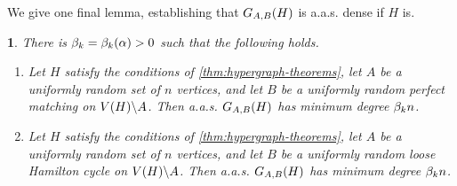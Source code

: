 \documentclass[11pt,english]{article}
\theoremstyle{plain}
\theoremstyle{definition}
\theoremstyle{definition}
\theoremstyle{plain}
\theoremstyle{plain}
\theoremstyle{plain}
\newtheorem{lem}[thm]{\protect\lemmaname}
\theoremstyle{plain}
\theoremstyle{remark}
\theoremstyle{remark}
\let\originalleft\left
\let\originalright\right
\renewcommand{\left}{\mathopen{}\mathclose\bgroup\originalleft}
\renewcommand{\right}{\aftergroup\egroup\originalright}
\providecommand{\lemmaname}{Lemma}
\begin{document}
We give one final lemma, establishing that $G_{A,B}\left(H\right)$ is a.a.s. dense if $H$ is.
\begin{lem}
\label{lem:hypergraph-bipartite-degree-transfer}There is $\a=\a\left(\alpha\right)>0$ such that the following
holds.

\begin{enumerate}[topsep=0px,label=(\alph*)]

\item{\label{itm:hypergraph-bipartite-matching-degree-transfer}Let $H$ satisfy the conditions of \ref{thm:hypergraph-theorems},
let $A$ be a uniformly random set of $n$ vertices, and let $B$
be a uniformly random perfect matching on $V\left(H\right)\backslash A$.
Then a.a.s. $G_{A,B}\left(H\right)$ has minimum degree $\beta_k n$.}

\item{\label{itm:hypergraph-bipartite-cycle-degree-transfer}Let $H$ satisfy the conditions of \ref{thm:hypergraph-theorems},
let $A$ be a uniformly random set of $n$ vertices, and let $B$
be a uniformly random loose Hamilton cycle on $V\left(H\right)\backslash A$.
Then a.a.s. $G_{A,B}\left(H\right)$ has minimum degree $\beta_k n$.}

\end{enumerate}\end{lem}
\end{document}
